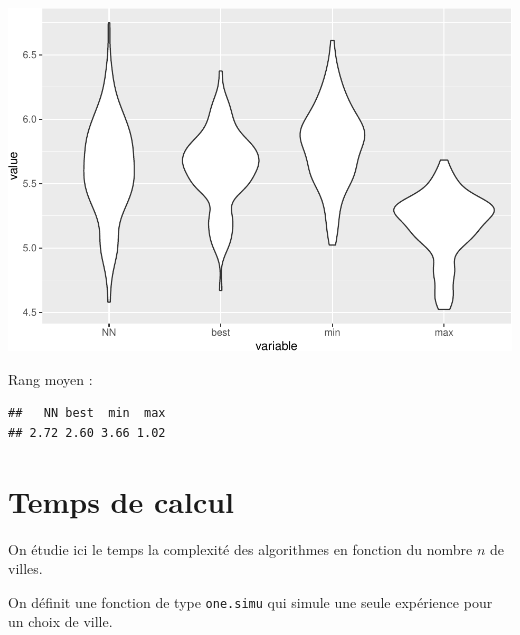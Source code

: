 \documentclass[
]{article}
\begin{document}
\includegraphics{rapport_TSP_files/figure-latex/unnamed-chunk-2-1.pdf}

Rang moyen :

\begin{verbatim}
##   NN best  min  max 
## 2.72 2.60 3.66 1.02
\end{verbatim}

\hypertarget{temps-de-calcul}{%
\section{Temps de calcul}\label{temps-de-calcul}}

On étudie ici le temps la complexité des algorithmes en fonction du
nombre \(n\) de villes.

On définit une fonction de type \texttt{one.simu} qui simule une seule
expérience pour un choix de ville.
\end{document}
